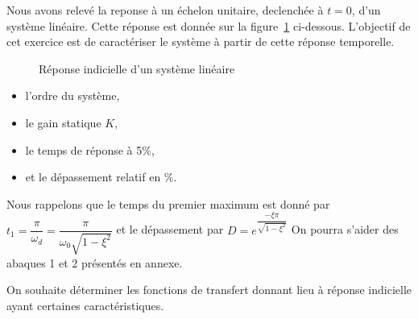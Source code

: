 Nous avons relevé la reponse à un échelon unitaire, 
declenchée à $t=0$, d'un système linéaire.
Cette réponse est donnée sur la figure~\ref{fig-2nd} ci-dessous.
L'objectif de cet exercice est de caractériser le système 
à partir de cette réponse temporelle.
\begin{figure}[!h]
    \centering
    
    \caption{Réponse indicielle d'un système linéaire\label{fig-2nd}}
\end{figure}
\begin{itemize}
    \item l'ordre du système,
    \item le gain statique $K$,
    \item le temps de réponse à 5\%,
    \item et le dépassement relatif en \%.
\end{itemize}
Nous rappelons que le temps du premier maximum est 
donné par $t_1=\dfrac{\pi}{\omega_d}=\dfrac{\pi}{\omega_0\sqrt{1-\xi^2}}$
et le dépassement par $D=e^{\dfrac{-\xi\pi}{\sqrt{1-\xi^2}}}$
On pourra s'aider des abaques 1 et 2 présentés en annexe.

\clearpage
On souhaite déterminer les fonctions de transfert donnant lieu à réponse 
indicielle ayant certaines caractéristiques.
\acpl


